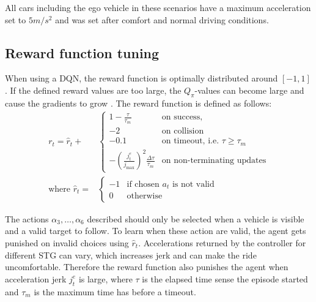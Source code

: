 All cars including the ego vehicle in these scenarios have a maximum acceleration set to $5 m/s^2$ and was set after comfort and normal driving conditions. 

\subsection{Reward function tuning}
When using a DQN, the reward function is optimally distributed around $[-1, 1]$. If the defined reward values are too large, the $Q_\pi$-values can become large and cause the gradients to grow \cite{VanHasseltLearningMagnitude}. 
The reward function is defined as follows:
\begin{align*}
r_t = \hat{r}_t + &\begin{cases}
1 - \frac{\tau}{\tau_m} & \text{on success, }\\
-2                 & \text{on collision}\\
-0.1                & \text{on timeout, i.e. } \tau \ge \tau_m\\
-\left(\frac{j^{e}_t}{j_{\max}}\right)^2\frac{\Delta \tau}{\tau_m}         & \text{on non-terminating updates}
\end{cases} \\
\text{where } \hat{r}_t = &\begin{cases}
-1  & \text{if chosen $a_t$ is not valid}\\
0   & \text{otherwise}
\end{cases}
\end{align*}

\noindent The actions $\alpha_3, \dots, \alpha_6$ described should only be selected when a vehicle is visible and a valid target to follow. To learn when these action are valid, the agent gets punished on invalid choices using $\hat r_t$. Accelerations returned by the controller for different STG can vary, which increases jerk and can make the ride uncomfortable. Therefore the reward function also punishes the agent when acceleration jerk $j^{e}_t$ is large, where $\tau$ is the elapsed time sense the episode started and $\tau_m$ is the maximum time has before a timeout. 

